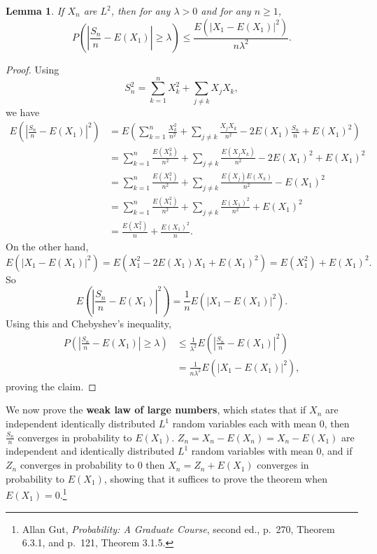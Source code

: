 \documentclass{article}
\newtheorem{lemma}[theorem]{Lemma}
\theoremstyle{definition}
\begin{document}
\begin{lemma}
If $X_n$ are $L^2$, then for any $\lambda>0$ and for any
$n \geq 1$,
\[
P\left(\left| \frac{S_n}{n} - E(X_1)\right| \geq \lambda\right) \leq \frac{E(|X_1-E(X_1)|^2)}{n \lambda^2}.
\]
\label{secondmoment}
\end{lemma}
\begin{proof}
Using
\[
S_n^2 = \sum_{k=1}^n X_k^2 + \sum_{j \neq k} X_j X_k,
\]
we have
\begin{align*}
E\left( \left| \frac{S_n}{n} - E(X_1) \right|^2 \right)&=
E\left( \sum_{k=1}^n \frac{X_k^2}{n^2} + \sum_{j \neq k} \frac{X_j X_k}{n^2}
-2E(X_1) \frac{S_n}{n} + E(X_1)^2 \right)\\
&=\sum_{k=1}^n \frac{E(X_k^2)}{n^2} + 
\sum_{j \neq k} \frac{E(X_j X_k)}{n^2}
-2E(X_1)^2
+E(X_1)^2\\
&=\sum_{k=1}^n \frac{E(X_1^2)}{n^2} + \sum_{j \neq k} \frac{E(X_j) E(X_k)}{n^2}-E(X_1)^2\\
&=\sum_{k=1}^n \frac{E(X_1^2)}{n^2}
+\sum_{j \neq k} \frac{E(X_1)^2}{n^2}
+E(X_1)^2\\
&=\frac{E(X_1^2)}{n}+\frac{E(X_1)^2}{n}.
\end{align*}
On the other hand,
\[
E(|X_1-E(X_1)|^2) = E(X_1^2-2E(X_1)X_1+E(X_1)^2)
=E(X_1^2)+E(X_1)^2.
\]
So
\[
E\left( \left| \frac{S_n}{n} - E(X_1) \right|^2 \right) = \frac{1}{n} E(|X_1-E(X_1)|^2).
\]
Using this and Chebyshev's inequality,
\begin{align*}
P\left(\left| \frac{S_n}{n} - E(X_1)\right| \geq \lambda\right)&\leq 
\frac{1}{\lambda^2} E\left(\left| \frac{S_n}{n} - E(X_1)\right|^2 \right)\\
&=\frac{1}{n\lambda^2}E(|X_1-E(X_1)|^2),
\end{align*}
proving the claim.
\end{proof}



We now prove the \textbf{weak law of large numbers}, which states that if
$X_n$ are independent identically distributed $L^1$ random variables each with mean $0$, then
$\frac{S_n}{n}$ converges in probability to $E(X_1)$.
$Z_n=X_n-E(X_n)=X_n-E(X_1)$ are independent and identically distributed $L^1$ random variables
with mean $0$, and if $Z_n$ converges in probability to $0$ then $X_n=Z_n+E(X_1)$ converges in probability
to $E(X_1)$, showing that it suffices to prove the theorem when $E(X_1)=0$.\footnote{Allan Gut, {\em Probability: A Graduate Course}, second ed.,
p.~270, Theorem 6.3.1, and p.~121, Theorem 3.1.5.}
\end{document}
